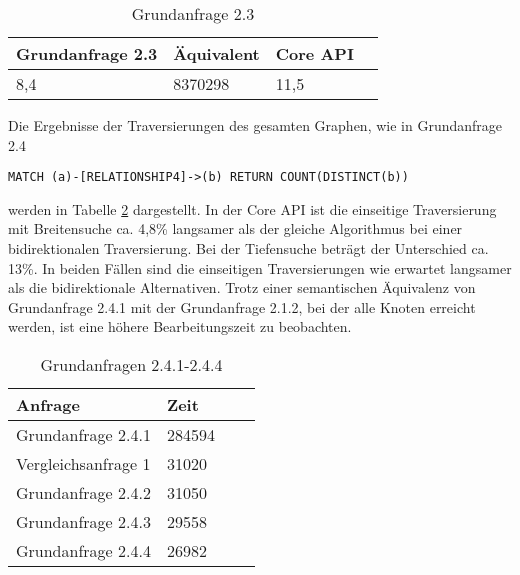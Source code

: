 \FloatBarrier
\begin{table}[!htb]
	\centering
		\begin{tabular}{ |p{3cm}|p{3cm}|p{3cm}|p{3cm}|  }
			\hline
			Grundanfrage 2.3 & Äquivalent&Core API\\
			\hline
			8,4    & 8370298 &  11,5\\
			\hline
		\end{tabular}
		\caption{Grundanfrage 2.3}
		\label{tab:Query2_3}
\end{table}
\FloatBarrier
\noindent Die Ergebnisse der Traversierungen des gesamten Graphen, wie in Grundanfrage 2.4
 \begin{Verbatim}[frame=single]
MATCH (a)-[RELATIONSHIP4]->(b) RETURN COUNT(DISTINCT(b))
\end{Verbatim}
 werden in Tabelle \ref{tab:Query2_4} dargestellt.
 In der Core API ist die einseitige Traversierung mit Breitensuche ca. 4,8\% langsamer als der gleiche Algorithmus bei einer bidirektionalen Traversierung. Bei der Tiefensuche beträgt der Unterschied ca. 13\%. In beiden Fällen sind die einseitigen Traversierungen wie erwartet langsamer als die bidirektionale Alternativen. \newline
Trotz einer semantischen Äquivalenz von Grundanfrage 2.4.1 mit der Grundanfrage 2.1.2, bei der alle Knoten erreicht werden, ist eine höhere Bearbeitungszeit zu beobachten. 
\FloatBarrier
\begin{table}[!htb]
	\centering
	\begin{tabular}{ |p{5cm}||p{3cm}|p{3cm}|p{3cm}|  }
		\hline
		Anfrage & Zeit\\
		\hline
		Grundanfrage 2.4.1 & 284594\\
		\hline
		Vergleichsanfrage 1 & 31020  \\
		\hline
		Grundanfrage 2.4.2 & 31050\\
		\hline
		Grundanfrage 2.4.3 &  29558  \\
		\hline
		Grundanfrage 2.4.4 &  26982\\
		\hline
	\end{tabular}
	\caption{Grundanfragen 2.4.1-2.4.4}
	\label{tab:Query2_4}
\end{table}
\FloatBarrier

